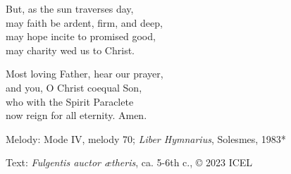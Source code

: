 \hymn



\begin{underhymnverse}
But, as the sun traverses day,\\
may faith be ardent, firm, and deep,\\
may hope incite to promised good,\\
may charity wed us to Christ.

Most loving Father, hear our prayer,\\
and you, O Christ coequal Son,\\
who with the Spirit Paraclete\\
now reign for all eternity. Amen.
\end{underhymnverse}

\begin{hymnsource}
Melody: Mode IV, melody 70; \emph{Liber Hymnarius}, Solesmes, 1983*

Text: \emph{Fulgentis auctor ætheris}, ca. 5-6th c., © 2023 ICEL
\end{hymnsource}
